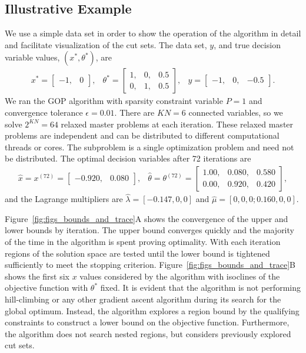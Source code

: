 \documentclass[11pt]{article}
\begin{document}
\subsection{Illustrative Example}
%
We use a simple data set in order to show the
operation of the algorithm in detail and facilitate visualization of the cut sets. The data set, $y$, and true
decision variable values, $(x^*, \theta^*)$, are
%
\begin{eqnarray*}
	x^* =
	\left[ 
	\begin{array}{cc} 
		-1, & 0
	\end{array} 
	\right],
	&
	\theta^* = 
	\left[ 
	\begin{array}{ccc} 
		1, & 0, & 0.5 \\
		0, & 1, & 0.5
	\end{array} 
	\right],
	&
	y = 
	\left[ 
	\begin{array}{ccc} 
		-1, & 0, & -0.5
	\end{array} 
	\right].
\end{eqnarray*}
%
We ran the GOP algorithm with sparsity constraint variable $P=1$ and convergence tolerance $\epsilon = 0.01$. 
There are $KN = 6$ connected variables, so we solve $2^{KN} = 64$ relaxed master problems at each iteration. 
These relaxed master problems are independent and can be distributed to different computational threads or cores. 
The subproblem is a single optimization problem and need not be distributed. 
The optimal decision variables after 72 iterations are
%
\begin{eqnarray*}
	\hat{x} = x^{(72)} =
	\left[ 
	\begin{array}{cc} 
		-0.920, & 0.080
	\end{array} 
	\right],
	&
	\hat{\theta} = \theta^{(72)} =
	\left[ 
	\begin{array}{ccc} 
		1.00, & 0.080, & 0.580 \\
		0.00, & 0.920, & 0.420
	\end{array} 
	\right],
\end{eqnarray*}
%
and the Lagrange multipliers are $\hat{\lambda} = [-0.147, 0, 0]$ and $\hat{\mu} = [0, 0, 0; 0.160, 0, 0]$.

Figure~\ref{fig:figs_bounds_and_trace}A shows the convergence of the upper and lower bounds by iteration. 
The upper bound converges quickly and the majority of the time in the algorithm is spent proving optimality. 
With each iteration regions of the solution space are tested until the lower bound is tightened sufficiently to meet the stopping criterion. 
Figure~\ref{fig:figs_bounds_and_trace}B shows the first six $x$ values considered by the algorithm with isoclines of the objective function with $\theta^*$ fixed. 
It is evident that the algorithm is not performing hill-climbing or any other gradient ascent algorithm during its search for the global optimum. 
Instead, the algorithm explores a region bound by the qualifying constraints to construct a lower bound on the objective function. 
Furthermore, the algorithm does not search nested regions, but considers previously explored cut sets.
\end{document}
